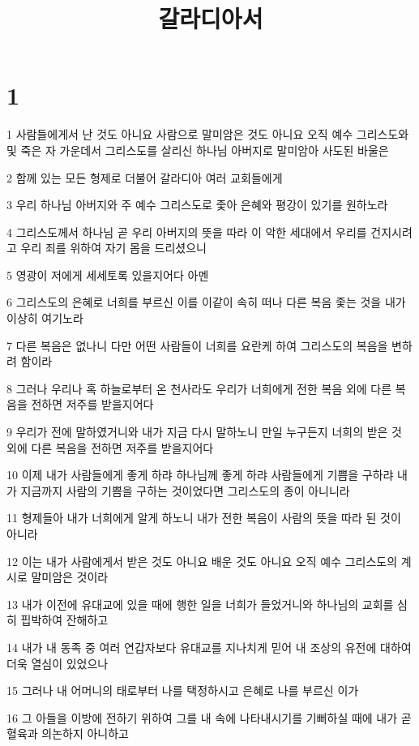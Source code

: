 

\title{갈라디아서}


\chapter{1}

\par 1 사람들에게서 난 것도 아니요 사람으로 말미암은 것도 아니요 오직 예수 그리스도와 및 죽은 자 가운데서 그리스도를 살리신 하나님 아버지로 말미암아 사도된 바울은
\par 2 함께 있는 모든 형제로 더불어 갈라디아 여러 교회들에게
\par 3 우리 하나님 아버지와 주 예수 그리스도로 좇아 은혜와 평강이 있기를 원하노라
\par 4 그리스도께서 하나님 곧 우리 아버지의 뜻을 따라 이 악한 세대에서 우리를 건지시려고 우리 죄를 위하여 자기 몸을 드리셨으니
\par 5 영광이 저에게 세세토록 있을지어다 아멘
\par 6 그리스도의 은혜로 너희를 부르신 이를 이같이 속히 떠나 다른 복음 좇는 것을 내가 이상히 여기노라
\par 7 다른 복음은 없나니 다만 어떤 사람들이 너희를 요란케 하여 그리스도의 복음을 변하려 함이라
\par 8 그러나 우리나 혹 하늘로부터 온 천사라도 우리가 너희에게 전한 복음 외에 다른 복음을 전하면 저주를 받을지어다
\par 9 우리가 전에 말하였거니와 내가 지금 다시 말하노니 만일 누구든지 너희의 받은 것 외에 다른 복음을 전하면 저주를 받을지어다
\par 10 이제 내가 사람들에게 좋게 하랴 하나님께 좋게 하랴 사람들에게 기쁨을 구하랴 내가 지금까지 사람의 기쁨을 구하는 것이었다면 그리스도의 종이 아니니라
\par 11 형제들아 내가 너희에게 알게 하노니 내가 전한 복음이 사람의 뜻을 따라 된 것이 아니라
\par 12 이는 내가 사람에게서 받은 것도 아니요 배운 것도 아니요 오직 예수 그리스도의 계시로 말미암은 것이라
\par 13 내가 이전에 유대교에 있을 때에 행한 일을 너희가 들었거니와 하나님의 교회를 심히 핍박하여 잔해하고
\par 14 내가 내 동족 중 여러 연갑자보다 유대교를 지나치게 믿어 내 조상의 유전에 대하여 더욱 열심이 있었으나
\par 15 그러나 내 어머니의 태로부터 나를 택정하시고 은혜로 나를 부르신 이가
\par 16 그 아들을 이방에 전하기 위하여 그를 내 속에 나타내시기를 기뻐하실 때에 내가 곧 혈육과 의논하지 아니하고

